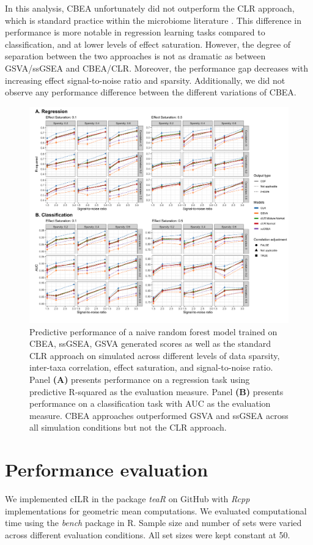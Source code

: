 \documentclass{article}
\begin{document}
In this analysis, CBEA unfortunately did not outperform the CLR approach, which is standard practice within the microbiome literature \cite{gloor2017}. This difference in performance is more notable in regression learning tasks compared to classification, and at lower levels of effect saturation. However, the degree of separation between the two approaches is not as dramatic as between GSVA/ssGSEA and CBEA/CLR. Moreover, the performance gap decreases with increasing effect signal-to-noise ratio and sparsity. Additionally, we did not observe any performance difference between the different variations of CBEA. 

\begin{figure}[!h]
    \centering
    \includegraphics[width = \linewidth]{figures/sim_pred_combined.png}
    \caption{Predictive performance of a naive random forest model trained on CBEA, ssGSEA, GSVA generated scores as well as the standard CLR approach on simulated across different levels of data sparsity, inter-taxa correlation, effect saturation, and signal-to-noise ratio. Panel \textbf{(A)} presents performance on a regression task using predictive R-squared as the evaluation measure. Panel \textbf{(B)} presents performance on a classification task with AUC as the evaluation measure. CBEA approaches outperformed GSVA and ssGSEA across all simulation conditions but not the CLR approach.}
    \label{fig:6}
\end{figure}


\section{Performance evaluation} 
We implemented cILR in the package \emph{teaR} on GitHub with \emph{Rcpp} implementations for geometric mean computations. We evaluated computational time using the \emph{bench} package in R. Sample size and number of sets were varied across different evaluation conditions. All set sizes were kept constant at 50. 
\end{document}
